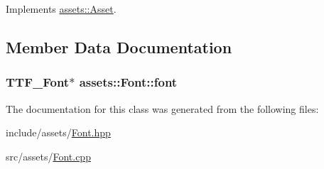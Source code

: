 Implements \hyperlink{classassets_1_1Asset_a43d029b59109ff2952206969d503c25f}{assets\-::\-Asset}.



\subsection{Member Data Documentation}
\hypertarget{classassets_1_1Font_aa15c7b8a6244a7e2db791137ee607bab}{
\subsubsection[{font}]{\setlength{\rightskip}{0pt plus 5cm}T\-T\-F\-\_\-\-Font$\ast$ assets\-::\-Font\-::font}}\label{classassets_1_1Font_aa15c7b8a6244a7e2db791137ee607bab}


The documentation for this class was generated from the following files\-:\begin{DoxyCompactItemize}
\item 
include/assets/\hyperlink{Font_8hpp}{Font.\-hpp}\item 
src/assets/\hyperlink{Font_8cpp}{Font.\-cpp}\end{DoxyCompactItemize}
